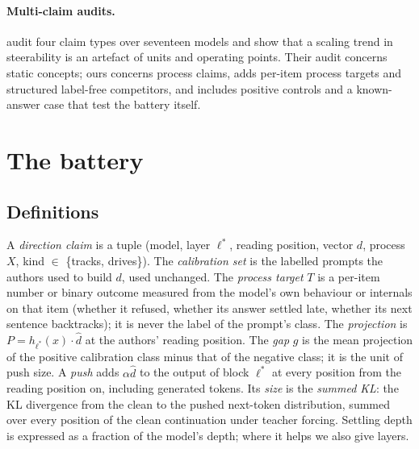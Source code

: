 \documentclass[11pt]{article}
\newcommand{\dhat}{\hat{d}}
\begin{document}
\paragraph{Multi-claim audits.} \citet{wu2026steerable} audit four claim types over seventeen models and show that a scaling trend in steerability is an artefact of units and operating points. Their audit concerns static concepts; ours concerns process claims, adds per-item process targets and structured label-free competitors, and includes positive controls and a known-answer case that test the battery itself.

\section{The battery}\label{sec:battery}

\subsection{Definitions}
A \emph{direction claim} is a tuple (model, layer $\ell^*$, reading position, vector $d$, process $X$, kind $\in$ \{tracks, drives\}). The \emph{calibration set} is the labelled prompts the authors used to build $d$, used unchanged. The \emph{process target} $T$ is a per-item number or binary outcome measured from the model's own behaviour or internals on that item (whether it refused, whether its answer settled late, whether its next sentence backtracks); it is never the label of the prompt's class. The \emph{projection} is $P = h_{\ell^*}(x)\cdot\dhat$ at the authors' reading position. The \emph{gap} $g$ is the mean projection of the positive calibration class minus that of the negative class; it is the unit of push size. A \emph{push} adds $\alpha\dhat$ to the output of block $\ell^*$ at every position from the reading position on, including generated tokens. Its \emph{size} is the \emph{summed KL}: the KL divergence from the clean to the pushed next-token distribution, summed over every position of the clean continuation under teacher forcing. Settling depth is expressed as a fraction of the model's depth; where it helps we also give layers.
\end{document}

